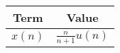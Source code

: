   
  \begin{tabular}{|c|c|}
    \hline
    \textbf{Term} & \textbf{Value} \\
    \hline
    $x(n)$ & $\frac{n}{n+1}$$u(n)$ \\
    \hline
  \end{tabular}
  
